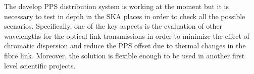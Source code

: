 The develop PPS distribution system is working at the moment but it is 
necessary to test in depth in the SKA places in order to check all the 
possible scenarios. Specifically, one of the key aspects is the evaluation of 
other wavelengths for the optical link transmissions in order to minimize the 
effect of chromatic dispersion and reduce the PPS offset due to thermal changes 
in the fibre link. Moreover, the solution is flexible enough to be used in 
another first level scientific projects. 
